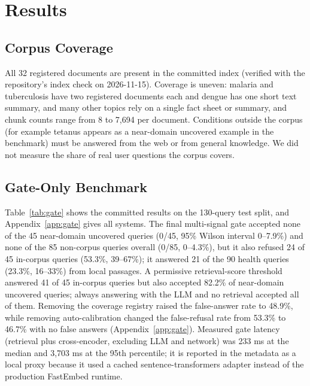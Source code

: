 \documentclass[10pt,a4paper]{article}
\begin{document}
\section{Results}
\subsection{Corpus Coverage}
All 32 registered documents are present in the committed index (verified with the repository's index check on 2026-11-15). Coverage is uneven: malaria and tuberculosis have two registered documents each and dengue has one short text summary, and many other topics rely on a single fact sheet or summary, and chunk counts range from 8 to 7,694 per document. Conditions outside the corpus (for example tetanus appears as a near-domain uncovered example in the benchmark) must be answered from the web or from general knowledge. We did not measure the share of real user questions the corpus covers.

\subsection{Gate-Only Benchmark}
Table~\ref{tab:gate} shows the committed results on the 130-query test split, and Appendix~\ref{app:gate} gives all systems. The final multi-signal gate accepted none of the 45 near-domain uncovered queries (0/45, 95\% Wilson interval 0--7.9\%) and none of the 85 non-corpus queries overall (0/85, 0--4.3\%), but it also refused 24 of 45 in-corpus queries (53.3\%, 39--67\%); it answered 21 of the 90 health queries (23.3\%, 16--33\%) from local passages. A permissive retrieval-score threshold answered 41 of 45 in-corpus queries but also accepted 82.2\% of near-domain uncovered queries; always answering with the LLM and no retrieval accepted all of them. Removing the coverage registry raised the false-answer rate to 48.9\%, while removing auto-calibration changed the false-refusal rate from 53.3\% to 46.7\% with no false answers (Appendix~\ref{app:gate}). Measured gate latency (retrieval plus cross-encoder, excluding LLM and network) was 233 ms at the median and 3,703 ms at the 95th percentile; it is reported in the metadata as a local proxy because it used a cached sentence-transformers adapter instead of the production FastEmbed runtime.
\end{document}
